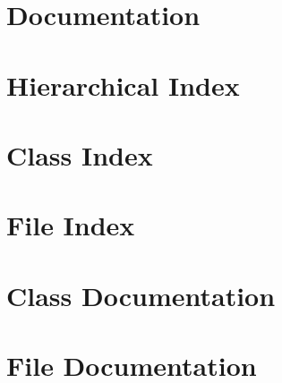 \documentclass[twoside]{book}
\newcommand{\+}{\discretionary{\mbox{\scriptsize$\hookleftarrow$}}{}{}}
\newcommand{\clearemptydoublepage}{%
  \newpage{\pagestyle{empty}\cleardoublepage}%
}
\begin{document}
\chapter{Documentation}
\label{md_src_README}
\hypertarget{md_src_README}{}

\chapter{Hierarchical Index}

\chapter{Class Index}

\chapter{File Index}

\chapter{Class Documentation}














\chapter{File Documentation}



















\backmatter
\newpage
{}
\clearemptydoublepage
{}
\printindex
\end{document}
